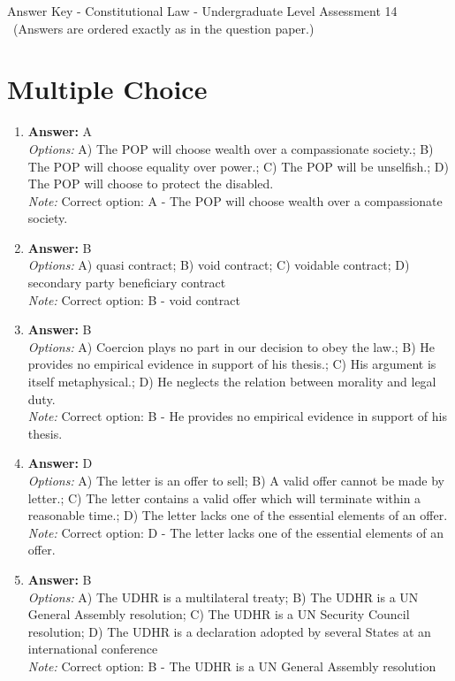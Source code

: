 \documentclass[12pt]{article}
\begin{document}
\begin{center}
Answer Key - Constitutional Law - Undergraduate Level Assessment 14 \
\small (Answers are ordered exactly as in the question paper.)
\end{center}

\section*{Multiple Choice}
\begin{enumerate}[label=\arabic*.]
\item \textbf{Answer:} A
\\ \textit{Options:} A) The POP will choose wealth over a compassionate society.; B) The POP will choose equality over power.; C) The POP will be unselfish.; D) The POP will choose to protect the disabled.
\\ \textit{Note:} Correct option: A - The POP will choose wealth over a compassionate society.
\item \textbf{Answer:} B
\\ \textit{Options:} A) quasi contract; B) void contract; C) voidable contract; D) secondary party beneficiary contract
\\ \textit{Note:} Correct option: B - void contract
\item \textbf{Answer:} B
\\ \textit{Options:} A) Coercion plays no part in our decision to obey the law.; B) He provides no empirical evidence in support of his thesis.; C) His argument is itself metaphysical.; D) He neglects the relation between morality and legal duty.
\\ \textit{Note:} Correct option: B - He provides no empirical evidence in support of his thesis.
\item \textbf{Answer:} D
\\ \textit{Options:} A) The letter is an offer to sell; B) A valid offer cannot be made by letter.; C) The letter contains a valid offer which will terminate within a reasonable time.; D) The letter lacks one of the essential elements of an offer.
\\ \textit{Note:} Correct option: D - The letter lacks one of the essential elements of an offer.
\item \textbf{Answer:} B
\\ \textit{Options:} A) The UDHR is a multilateral treaty; B) The UDHR is a UN General Assembly resolution; C) The UDHR is a UN Security Council resolution; D) The UDHR is a declaration adopted by several States at an international conference
\\ \textit{Note:} Correct option: B - The UDHR is a UN General Assembly resolution
\end{enumerate}
\end{document}
